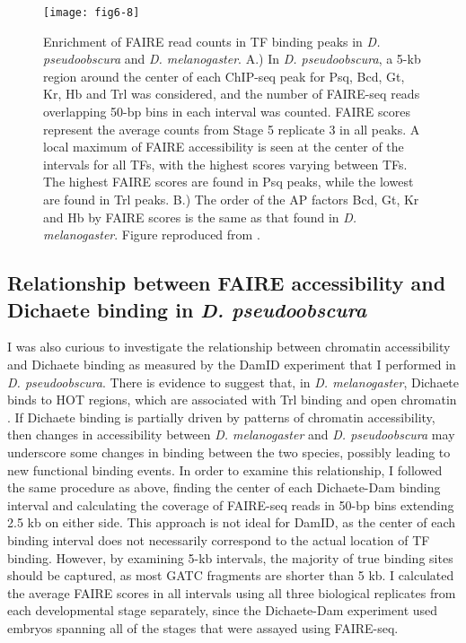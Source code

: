 \begin{figure}
\centering
\texttt{[image: fig6-8]}
\caption{Enrichment of FAIRE read counts in TF binding peaks in \emph{D. pseudoobscura} and \emph{D. melanogaster}. A.) In \emph{D. pseudoobscura}, a 5-kb region around the center of each ChIP-seq peak for Psq, Bcd, Gt, Kr, Hb and Trl was considered, and the number of FAIRE-seq reads overlapping 50-bp bins in each interval was counted. FAIRE scores represent the average counts from Stage 5 replicate 3 in all peaks. A local maximum of FAIRE accessibility is seen at the center of the intervals for all TFs, with the highest scores varying between TFs. The highest FAIRE scores are found in Psq peaks, while the lowest are found in Trl peaks. B.) The order of the AP factors Bcd, Gt, Kr and Hb by FAIRE scores is the same as that found in \emph{D. melanogaster}. Figure reproduced from \citet{mckay_common_2013}.}
\label{Figure 6.8}
\end{figure}

\subsection{Relationship between FAIRE accessibility and Dichaete binding in \emph{D. pseudoobscura}}
I was also curious to investigate the relationship between chromatin accessibility and Dichaete binding as measured by the DamID experiment that I performed in \emph{D. pseudoobscura}. There is evidence to suggest that, in \emph{D. melanogaster}, Dichaete binds to HOT regions, which are associated with Trl binding and open chromatin \citep{aleksic_role_2013,kvon_hot_2012}. If Dichaete binding is partially driven by patterns of chromatin accessibility, then changes in accessibility between \emph{D. melanogaster} and \emph{D. pseudoobscura} may underscore some changes in binding between the two species, possibly leading to new functional binding events. In order to examine this relationship, I followed the same procedure as above, finding the center of each Dichaete-Dam binding interval and calculating the coverage of FAIRE-seq reads in 50-bp bins extending 2.5 kb on either side. This approach is not ideal for DamID, as the center of each binding interval does not necessarily correspond to the actual location of TF binding. However, by examining 5-kb intervals, the majority of true binding sites should be captured, as most GATC fragments are shorter than 5 kb. I calculated the average FAIRE scores in all intervals using all three biological replicates from each developmental stage separately, since the Dichaete-Dam experiment used embryos spanning all of the stages that were assayed using FAIRE-seq.\\

